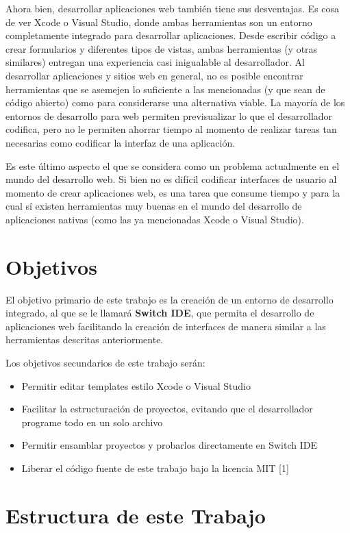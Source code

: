 \documentclass[12pt,spanish,letter]{report}
\begin{document}
Ahora bien, desarrollar aplicaciones web también tiene sus desventajas.
Es cosa de ver Xcode o Visual Studio, donde ambas herramientas son un
entorno completamente integrado para desarrollar aplicaciones. Desde
escribir código a crear formularios y diferentes tipos de vistas, ambas
herramientas (y otras similares) entregan una experiencia casi
inigualable al desarrollador. Al desarrollar aplicaciones y sitios web
en general, no es posible encontrar herramientas que se asemejen lo
suficiente a las mencionadas (y que sean de código abierto) como para
considerarse una alternativa viable. La mayoría de los entornos de
desarrollo para web permiten previsualizar lo que el desarrollador
codifica, pero no le permiten ahorrar tiempo al momento de realizar
tareas tan necesarias como codificar la interfaz de una aplicación.

Es este último aspecto el que se considera como un problema actualmente
en el mundo del desarrollo web. Si bien no es difícil codificar
interfaces de usuario al momento de crear aplicaciones web, es una tarea
que consume tiempo y para la cual sí existen herramientas muy buenas en
el mundo del desarrollo de aplicaciones nativas (como las ya mencionadas
Xcode o Visual Studio).

\section{Objetivos}

El objetivo primario de este trabajo es la creación de un entorno de
desarrollo integrado, al que se le llamará \textbf{Switch IDE}, que
permita el desarrollo de aplicaciones web facilitando la creación de
interfaces de manera similar a las herramientas descritas anteriormente.

Los objetivos secundarios de este trabajo serán:

\begin{itemize}
\item
  Permitir editar templates estilo Xcode o Visual Studio
\item
  Facilitar la estructuración de proyectos, evitando que el
  desarrollador programe todo en un solo archivo
\item
  Permitir ensamblar proyectos y probarlos directamente en Switch IDE
\item
  Liberar el código fuente de este trabajo bajo la licencia MIT {[}1{]}
\end{itemize}

\section{Estructura de este Trabajo}
\end{document}
